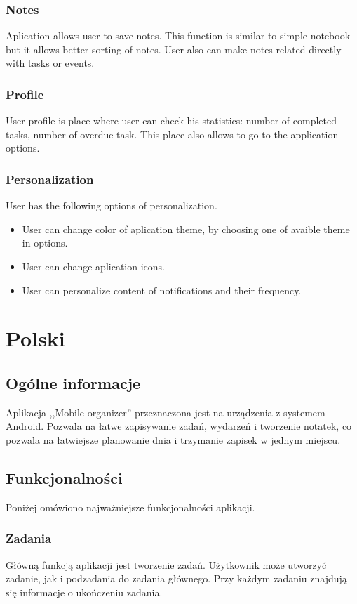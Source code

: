 \documentclass[a4paper,11pt]{article}
\begin{document}
\subsubsection{Notes}
Aplication allows user to save notes. This function is similar to simple notebook but it allows better sorting of notes. User also can make notes related directly with tasks or events.
\subsubsection{Profile}
User profile is place where user can check his statistics: number of completed tasks, number of overdue task. This place also allows to go to the application options.
\subsubsection{Personalization}
User has the following options of personalization.
\begin{itemize}
\item User can change color of aplication theme, by choosing one of avaible theme in options.
\item User can change aplication icons.
\item User can personalize content of notifications and their frequency. 
\end{itemize}
\section{Polski}
\subsection{Ogólne informacje}
Aplikacja ,,Mobile-organizer'' przeznaczona jest na urządzenia z systemem Android. Pozwala na łatwe zapisywanie zadań, wydarzeń i tworzenie notatek, 
co pozwala na łatwiejsze planowanie dnia i trzymanie zapisek w jednym miejscu.
\subsection{Funkcjonalności}
Poniżej omówiono najważniejsze funkcjonalności aplikacji.
\subsubsection{Zadania}
Główną funkcją aplikacji jest tworzenie zadań. Użytkownik może utworzyć zadanie, jak i podzadania do zadania głównego. Przy każdym zadaniu znajdują się informacje o ukończeniu zadania.
\end{document}
